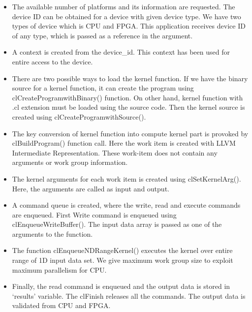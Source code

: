 \begin{itemize}
	\item The available number of platforms and its information are requested. The device ID can be obtained for a device with given device type. We have two types of device which is CPU and FPGA. This application receives device ID of any type, which is passed as a reference in the argument.
	
	\item A context is created from the device\_id. This context has been used for entire access to the device. 
	\item There are two possible ways to load the kernel function. If we have the binary source for a kernel function, it can create the program using clCreateProgramwithBinary() function. On other hand, kernel function with .cl extension must be loaded using the source code. Then the kernel source is created using clCreateProgramwithSource(). 
	\item The key conversion of kernel function into compute kernel part is provoked by clBuildProgram() function call. Here the work item is created with LLVM Intermediate Representation. These work-item does not contain any arguments or work group information. 
	
	\item The kernel arguments for each work item is created using clSetKernelArg(). Here, the arguments are called as input and output. 
	\item A command queue is created, where the write, read and execute commands are enqueued. First Write command is enqueued using clEnqueueWriteBuffer(). The input data array is passed as one of the arguments to the function.
	
	\item The function clEnqueueNDRangeKernel() executes the kernel over entire range of 1D input data set. We give maximum work group size to exploit maximum parallelism for CPU. 
	
	\item Finally, the read command is enqueued and the output data is stored in ‘results’ variable. The clFinish releases all the commands. The output data is validated from CPU and FPGA. 
\end{itemize}

